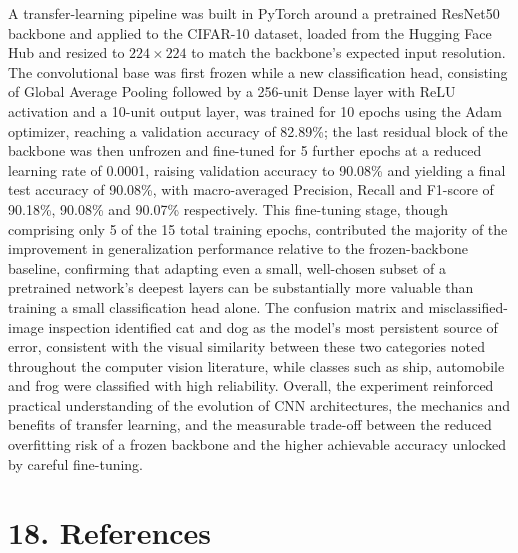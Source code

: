 \documentclass[11pt,a4paper]{article}
\begin{document}
A transfer-learning pipeline was built in PyTorch around a pretrained ResNet50 backbone and applied to the CIFAR-10 dataset, loaded from the Hugging Face Hub and resized to $224\times224$ to match the backbone's expected input resolution. The convolutional base was first frozen while a new classification head, consisting of Global Average Pooling followed by a 256-unit Dense layer with ReLU activation and a 10-unit output layer, was trained for 10 epochs using the Adam optimizer, reaching a validation accuracy of 82.89\%; the last residual block of the backbone was then unfrozen and fine-tuned for 5 further epochs at a reduced learning rate of 0.0001, raising validation accuracy to 90.08\% and yielding a final test accuracy of 90.08\%, with macro-averaged Precision, Recall and F1-score of 90.18\%, 90.08\% and 90.07\% respectively. This fine-tuning stage, though comprising only 5 of the 15 total training epochs, contributed the majority of the improvement in generalization performance relative to the frozen-backbone baseline, confirming that adapting even a small, well-chosen subset of a pretrained network's deepest layers can be substantially more valuable than training a small classification head alone. The confusion matrix and misclassified-image inspection identified cat and dog as the model's most persistent source of error, consistent with the visual similarity between these two categories noted throughout the computer vision literature, while classes such as ship, automobile and frog were classified with high reliability. Overall, the experiment reinforced practical understanding of the evolution of CNN architectures, the mechanics and benefits of transfer learning, and the measurable trade-off between the reduced overfitting risk of a frozen backbone and the higher achievable accuracy unlocked by careful fine-tuning.

\section*{18. References}
\end{document}

